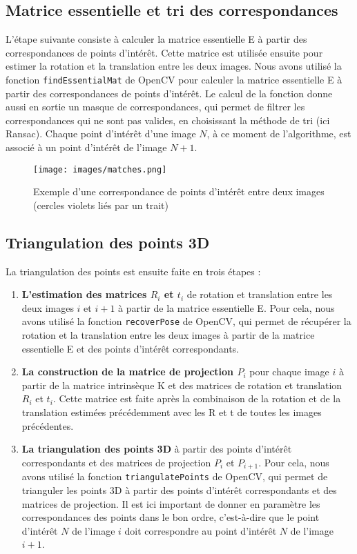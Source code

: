 \documentclass[12pt]{article}
\begin{document}
\subsection{Matrice essentielle et tri des correspondances}

L'étape suivante consiste à calculer la matrice essentielle E à partir des correspondances de points d'intérêt.
Cette matrice est utilisée ensuite pour estimer la rotation et la translation entre les deux images.
Nous avons utilisé la fonction \texttt{findEssentialMat} de OpenCV pour calculer la matrice essentielle E à partir des correspondances de points d'intérêt.
Le calcul de la fonction donne aussi en sortie un masque de correspondances, qui permet de filtrer les correspondances qui ne sont pas valides, en choisissant la méthode de tri (ici Ransac).
\linebreak
Chaque point d'intérêt d'une image $N$, à ce moment de l'algorithme, est associé à un point d'intérêt de l'image $N+1$.

\begin{figure}[H]
\centering
\texttt{[image: images/matches.png]}
\caption{Exemple d'une correspondance de points d'intérêt entre deux images (cercles violets liés par un trait)}
\label{fig:matches}
\end{figure}

\subsection{Triangulation des points 3D}

La triangulation des points est ensuite faite en trois étapes :
\begin{enumerate}
    \item \textbf{L'estimation des matrices $R_i$ et $t_i$} de rotation et translation entre les deux images $i$ et $i+1$ à partir de la matrice essentielle E. Pour cela, nous avons utilisé la fonction \texttt{recoverPose} de OpenCV, qui permet de récupérer la rotation et la translation entre les deux images à partir de la matrice essentielle E et des points d'intérêt correspondants.
    \item \textbf{La construction de la matrice de projection $P_i$} pour chaque image $i$ à partir de la matrice intrinsèque K et des matrices de rotation et translation $R_i$ et $t_i$. Cette matrice est faite après la combinaison de la rotation et de la translation estimées précédemment avec les R et t de toutes les images précédentes.
    \item \textbf{La triangulation des points 3D} à partir des points d'intérêt correspondants et des matrices de projection $P_i$ et $P_{i+1}$. Pour cela, nous avons utilisé la fonction \texttt{triangulatePoints} de OpenCV, qui permet de trianguler les points 3D à partir des points d'intérêt correspondants et des matrices de projection. 
    Il est ici important de donner en paramètre les correspondances des points dans le bon ordre, c'est-à-dire que le point d'intérêt $N$ de l'image $i$ doit correspondre au point d'intérêt $N$ de l'image $i+1$.
\end{enumerate}
\end{document}
